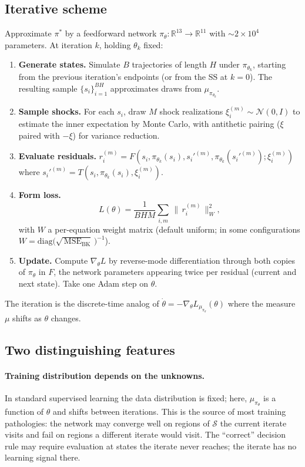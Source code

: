 \documentclass[11pt]{article}
\begin{document}
\subsection{Iterative scheme}

Approximate $\pi^*$ by a feedforward network
$\pi_\theta : \mathbb{R}^{13} \to \mathbb{R}^{11}$ with $\sim\!2\times
10^{4}$ parameters. At iteration $k$, holding $\theta_k$ fixed:

\begin{enumerate}
\item \textbf{Generate states.} Simulate $B$ trajectories of length
  $H$ under $\pi_{\theta_k}$, starting from the previous iteration's
  endpoints (or from the SS at $k = 0$). The resulting sample
  $\{s_i\}_{i=1}^{BH}$ approximates draws from $\mu_{\pi_{\theta_k}}$.
\item \textbf{Sample shocks.} For each $s_i$, draw $M$ shock
  realizations $\xi_i^{(m)} \sim \mathcal{N}(0, I)$ to estimate the
  inner expectation by Monte Carlo, with antithetic pairing
  ($\xi$ paired with $-\xi$) for variance reduction.
\item \textbf{Evaluate residuals.}
  $r_i^{(m)} = F(s_i, \pi_{\theta_k}(s_i), s_i'^{(m)}, \pi_{\theta_k}(s_i'^{(m)}); \xi_i^{(m)})$
  where $s_i'^{(m)} = T(s_i, \pi_{\theta_k}(s_i), \xi_i^{(m)})$.
\item \textbf{Form loss.}
  \[
    L(\theta) = \frac{1}{BHM}\sum_{i,m}\,\big\|\,r_i^{(m)}\,\big\|_W^2,
  \]
  with $W$ a per-equation weight matrix (default uniform; in some
  configurations $W = \mathrm{diag}\!\big(\sqrt{\,\mathrm{MSE}_{\text{BK}}}\,\big)^{-1}$).
\item \textbf{Update.} Compute $\nabla_\theta L$ by reverse-mode
  differentiation through both copies of $\pi_\theta$ in $F$, the
  network parameters appearing twice per residual (current and
  next state). Take one Adam step on $\theta$.
\end{enumerate}

The iteration is the discrete-time analog of
$\dot\theta = -\nabla_\theta L_{\mu_{\pi_\theta}}(\theta)$ where the
measure $\mu$ shifts as $\theta$ changes.

\subsection{Two distinguishing features}

\paragraph{Training distribution depends on the unknowns.}
In standard supervised learning the data distribution is fixed; here,
$\mu_{\pi_\theta}$ is a function of $\theta$ and shifts between
iterations. This is the source of most training pathologies: the
network may converge well on regions of $\mathcal{S}$ the current
iterate visits and fail on regions a different iterate would visit. The
``correct'' decision rule may require evaluation at states the iterate
never reaches; the iterate has no learning signal there.
\end{document}
